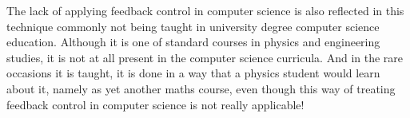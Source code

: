 The lack of applying feedback control in computer science is also reflected in this technique commonly not being taught in university degree computer science education. Although it is one of standard courses in physics and engineering studies, it is not at all present in the computer science curricula. And in the rare occasions it is taught, it is done in a way that a physics student would learn about it, namely as yet another maths course, even though this way of treating feedback control in computer science is not really applicable!






